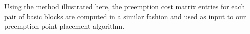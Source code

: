 \newline
\noindent
Using the method illustrated here, the preemption cost matrix entries for each pair of basic blocks are computed in a similar fashion and used as input to our preemption point placement algorithm.
%
%
%
%
%
%

